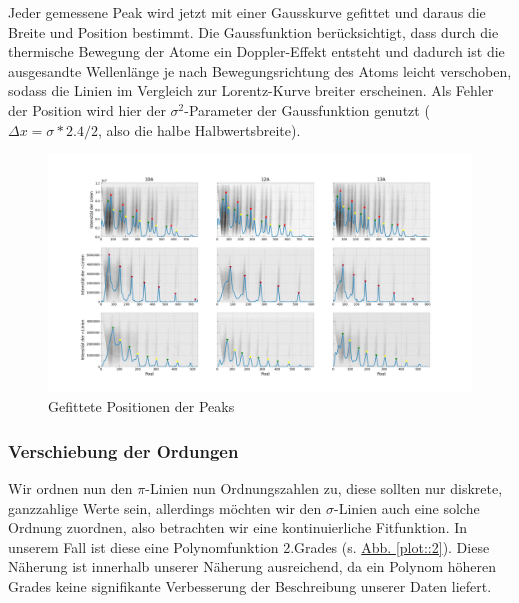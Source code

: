         Jeder gemessene Peak wird jetzt mit einer Gausskurve gefittet und daraus die Breite und Position bestimmt. Die Gaussfunktion berücksichtigt, dass durch die thermische Bewegung der Atome ein Doppler-Effekt entsteht und dadurch ist die ausgesandte Wellenlänge je nach Bewegungsrichtung des Atoms leicht verschoben, sodass die Linien im Vergleich zur Lorentz-Kurve breiter erscheinen. Als Fehler der Position wird hier der $\sigma^2$-Parameter der Gaussfunktion genutzt ($\Delta x = \sigma * 2.4 / 2$, also die halbe Halbwertsbreite).

        \begin{landscape}
          \thispagestyle{empty}
          \begin{figure}
            \vspace*{-2cm}
            \caption{Gefittete Positionen der Peaks}
            \hspace*{-6cm}\includegraphics[width=1.5\paperwidth]{Auswertung/peaks}
          \end{figure}
        \end{landscape}

      \subsubsection{Verschiebung der Ordungen}
        Wir ordnen nun den $\pi$-Linien nun Ordnungszahlen zu, diese sollten nur diskrete, ganzzahlige Werte sein, allerdings möchten wir den $\sigma$-Linien auch eine solche Ordnung zuordnen, also betrachten wir eine kontinuierliche Fitfunktion. In unserem Fall ist diese eine Polynomfunktion 2.Grades (s. \hyperref[plot::2]{Abb. \ref*{plot::2}}). Diese Näherung ist innerhalb unserer Näherung ausreichend, da ein Polynom höheren Grades keine signifikante Verbesserung der Beschreibung unserer Daten liefert.

